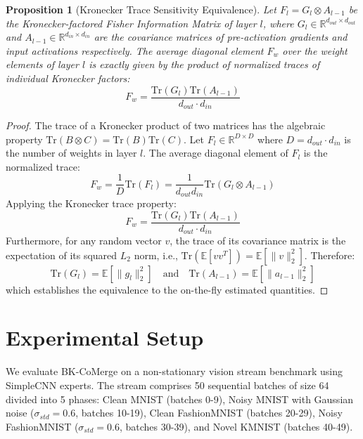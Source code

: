 \documentclass{article}
\theoremstyle{plain}
\newtheorem{proposition}[theorem]{Proposition}
\theoremstyle{definition}
\theoremstyle{remark}
\begin{document}
\begin{proposition}[Kronecker Trace Sensitivity Equivalence]
\label{prop:kronecker_trace}
Let $F_l = G_l \otimes A_{l-1}$ be the Kronecker-factored Fisher Information Matrix of layer $l$, where $G_l \in \mathbb{R}^{d_{out} \times d_{out}}$ and $A_{l-1} \in \mathbb{R}^{d_{in} \times d_{in}}$ are the covariance matrices of pre-activation gradients and input activations respectively. The average diagonal element $F_w$ over the weight elements of layer $l$ is exactly given by the product of normalized traces of individual Kronecker factors:
\begin{equation}
    F_w = \frac{\text{Tr}(G_l)\text{Tr}(A_{l-1})}{d_{out} \cdot d_{in}}
\end{equation}
\end{proposition}

\begin{proof}
The trace of a Kronecker product of two matrices has the algebraic property $\text{Tr}(B \otimes C) = \text{Tr}(B)\text{Tr}(C)$. Let $F_l \in \mathbb{R}^{D \times D}$ where $D = d_{out} \cdot d_{in}$ is the number of weights in layer $l$. The average diagonal element of $F_l$ is the normalized trace:
\begin{equation}
    F_w = \frac{1}{D}\text{Tr}(F_l) = \frac{1}{d_{out} d_{in}}\text{Tr}(G_l \otimes A_{l-1})
\end{equation}
Applying the Kronecker trace property:
\begin{equation}
    F_w = \frac{\text{Tr}(G_l)\text{Tr}(A_{l-1})}{d_{out} \cdot d_{in}}
\end{equation}
Furthermore, for any random vector $v$, the trace of its covariance matrix is the expectation of its squared $L_2$ norm, i.e., $\text{Tr}(\mathbb{E}[vv^T]) = \mathbb{E}[\|v\|_2^2]$. Therefore:
\begin{equation}
    \text{Tr}(G_l) = \mathbb{E}[\|g_l\|_2^2] \quad \text{and} \quad \text{Tr}(A_{l-1}) = \mathbb{E}[\|a_{l-1}\|_2^2]
\end{equation}
which establishes the equivalence to the on-the-fly estimated quantities.
\end{proof}

\section{Experimental Setup}
\label{sec:experiments}
We evaluate BK-CoMerge on a non-stationary vision stream benchmark using SimpleCNN experts. The stream comprises 50 sequential batches of size 64 divided into 5 phases: Clean MNIST (batches 0-9), Noisy MNIST with Gaussian noise ($\sigma_{std}=0.6$, batches 10-19), Clean FashionMNIST (batches 20-29), Noisy FashionMNIST ($\sigma_{std}=0.6$, batches 30-39), and Novel KMNIST (batches 40-49).
\end{document}
